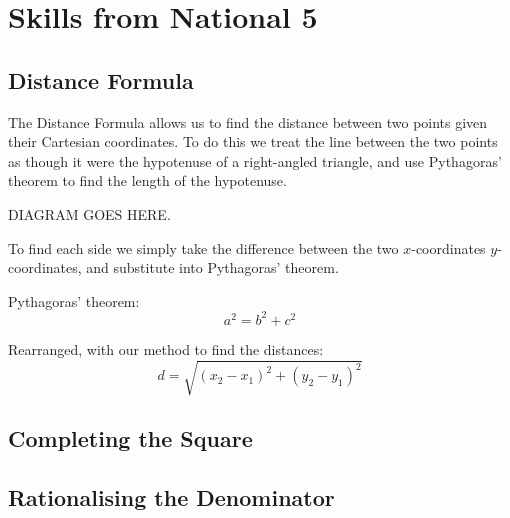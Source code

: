 \chapter{Skills from National 5}

\section{Distance Formula}
The Distance Formula allows us to find the distance between two points given their Cartesian coordinates. To do this we treat the line between the two points as though it were the hypotenuse of a right-angled triangle, and use Pythagoras' theorem to find the length of the hypotenuse.

DIAGRAM GOES HERE.

To find each side we simply take the difference between the two $x$-coordinates $y$-coordinates, and substitute into Pythagoras' theorem.

Pythagoras' theorem:
\begin{equation*}
	a^2 = b^2+c^2
\end{equation*}

Rearranged, with our method to find the distances:
\begin{equation*}
	d = \sqrt{(x_2-x_1)^2+(y_2-y_1)^2}
\end{equation*}

\section{Completing the Square}

\section{Rationalising the Denominator}
